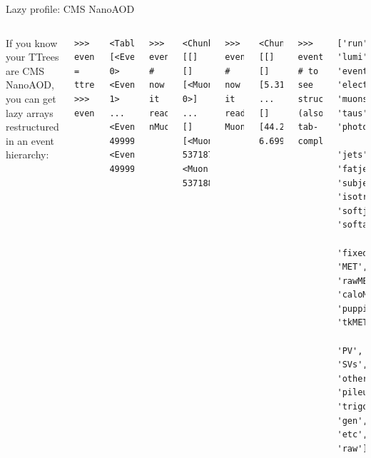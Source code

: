 \documentclass[aspectratio=169]{beamer}
\begin{document}
\begin{frame}[fragile]{Lazy profile: CMS NanoAOD}
\large
\vspace{0.5 cm}

\begin{columns}
If you know your TTrees are CMS NanoAOD, you can get lazy arrays restructured in an event hierarchy:

\small
\begin{verbatim}
>>> events = ttree.lazyarrays(profile="cms.nanoaod")
>>> events
\end{verbatim}

\vspace{-0.6 cm}
\color{darkblue}\begin{verbatim}
<Table [<Event 0> <Event 1> ... <Event 499998> <Event 499999>]>
\end{verbatim}
\color{black}

\vspace{-0.6 cm}
\begin{verbatim}
>>> events.muons        # now it reads nMuon...
\end{verbatim}

\vspace{-0.6 cm}
\color{darkblue}\begin{verbatim}
<ChunkedArray [[] [] [<Muon 0>] ... [] [<Muon 537187> <Muon 537188>]]>
\end{verbatim}
\color{black}

\vspace{-0.6 cm}
\begin{verbatim}
>>> events.muons.pt     # now it reads Muon_pt...
\end{verbatim}

\vspace{-0.6 cm}
\color{darkblue}\begin{verbatim}
<ChunkedArray [[] [] [5.315762] ... [] [44.28051 6.6997213]]>
\end{verbatim}
\color{black}

\vspace{-0.6 cm}
\begin{verbatim}
>>> events.columns      # to see structure (also tab-complete)
\end{verbatim}

\vspace{-0.6 cm}
\color{darkblue}\begin{verbatim}
['run', 'lumi', 'event', 'electrons', 'muons', 'taus', 'photons',
 'jets', 'fatjets', 'subjets', 'isotracks', 'softjets', 'softactivity',
 'fixedGridRhoFastjet', 'MET', 'rawMET', 'caloMET', 'puppiMET', 'tkMET',
 'PV', 'SVs', 'otherPVs', 'pileup', 'trigobjs', 'gen', 'etc', 'raw']
\end{verbatim}
\color{black}
\end{columns}
\end{frame}
\end{document}
